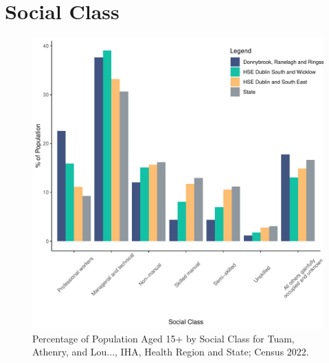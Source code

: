 \documentclass{article}
\begin{document}
\section{Social Class}\label{sect:SC}
\begin{figure}[H]
	\centering
	\includegraphics[width = 140mm]{../figures/SocialClassED.pdf}
	\caption{Percentage of Population Aged 15+ by Social Class for Tuam, Athenry, and Lou..., IHA, Health Region and State; Census 2022.}
	\label{fig:vbnv}
	\end{figure}
\end{document}
